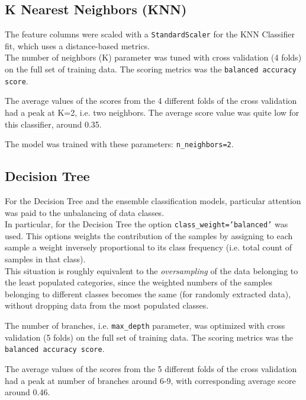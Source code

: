 \documentclass[11pt]{article}
\begin{document}
    \hypertarget{k-nearest-neighbors-knn}{%
\subsection{K Nearest Neighbors (KNN)}\label{k-nearest-neighbors-knn}}

The feature columns were scaled with a \texttt{StandardScaler} for the KNN Classifier fit, which uses a distance-based metrics.\\
The number of neighbors (K) parameter was tuned with cross validation (4 folds) on the full set of training data. The scoring metrics was the \texttt{balanced accuracy score}.

The average values of the scores from the 4 different folds of the cross validation had a peak at K=2, i.e. two neighbors. The average score value was quite low for this classifier, around 0.35.

The model was trained with these parameters: \texttt{n\_neighbors=2}.

    \hypertarget{decision-tree}{%
\subsection{Decision Tree}\label{decision-tree}}

For the Decision Tree and the ensemble classification models, particular attention was paid to the unbalancing of data classes.\\
In particular, for the Decision Tree the option \texttt{class\_weight='balanced'} was used. This options weights the contribution of the samples by assigning to each sample a weight inversely proportional to its class frequency (i.e. total count of samples in that class).\\
This situation is roughly equivalent to the \emph{oversampling} of the data belonging to the least populated categories, since the weighted numbers of the samples belonging to different classes becomes the same (for randomly extracted data), without dropping data from the most populated classes.

The number of branches, i.e. \texttt{max\_depth} parameter, was optimized with cross validation (5 folds) on the full set of training data. The scoring metrics was the \texttt{balanced accuracy score}.

The average values of the scores from the 5 different folds of the cross validation had a peak at number of branches around 6-9, with corresponding average score around 0.46.
\end{document}
